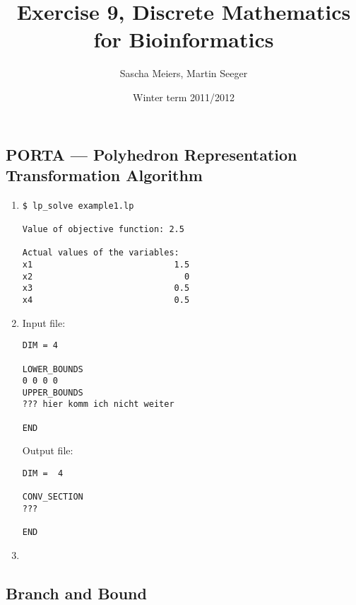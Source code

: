 \documentclass[a4paper, oneside]{scrartcl}
\author{Sascha Meiers, Martin Seeger}
\title{Exercise 9, Discrete Mathematics for Bioinformatics}
\date{Winter term 2011/2012}
\begin{document}
\maketitle


\subsection{PORTA --- Polyhedron Representation Transformation Algorithm}

\renewcommand{\labelenumi}{\alph{enumi})}
\begin{enumerate}
  \item 
\begin{verbatim}
$ lp_solve example1.lp 

Value of objective function: 2.5

Actual values of the variables:
x1                            1.5
x2                              0
x3                            0.5
x4                            0.5
\end{verbatim}

  \item 
Input file:
\begin{verbatim}
DIM = 4

LOWER_BOUNDS
0 0 0 0
UPPER_BOUNDS
??? hier komm ich nicht weiter

END
\end{verbatim}
Output file:
\begin{verbatim}
DIM =  4

CONV_SECTION
???

END
\end{verbatim}
\item 
\end{enumerate}

\subsection{Branch and Bound}
\end{document}
